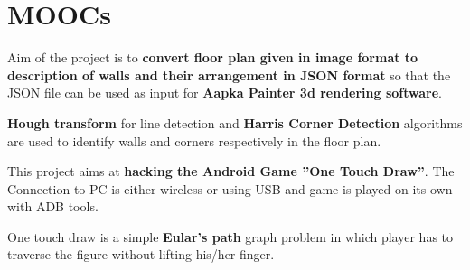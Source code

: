 \documentclass[]{deedy-resume-openfont}
\begin{document}
\begin{minipage}[t]{0.33\textwidth} 
\section{MOOCs}
\sectionsep
{}
\sectionsep
{}
\sectionsep
\end{minipage}
\hfill
\begin{minipage}[t]{0.66\textwidth} 
\begin{tightemize}
\item Aim of the project is to \textbf{convert floor plan given in image format to description of walls and their arrangement in JSON format} so that the JSON file can be used as input for \textbf{Aapka Painter 3d rendering software}.
\item \textbf{Hough transform} for line detection and \textbf{Harris Corner Detection} algorithms are used to identify walls and corners respectively in the floor plan.
\end{tightemize}
\sectionsep

\begin{tightemize}
\item This project aims at \textbf{hacking the Android Game ”One Touch Draw”}. The Connection to PC is either wireless or using USB and game is played on its own with ADB tools.
\item One touch draw is a simple \textbf{Eular’s path} graph problem in which player has to traverse the figure without lifting his/her finger.
\end{tightemize}
\sectionsep


\end{minipage}
\end{document}
